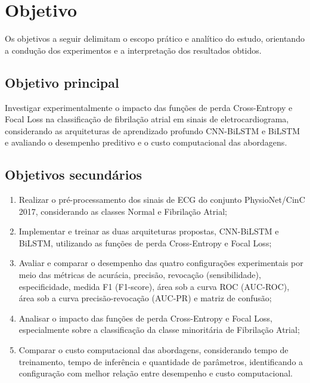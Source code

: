 \documentclass[
    12pt,                %
    openright,           %
    oneside,             %
    a4paper,             %
    english,             %
    brazil               %
]{abntex2}
\begin{document}
\section{Objetivo}
\label{sec:objetivo}

Os objetivos a seguir delimitam o escopo prático e analítico do estudo, orientando a condução dos experimentos e a interpretação dos resultados obtidos.

\subsection{Objetivo principal}

Investigar experimentalmente o impacto das funções
de perda Cross-Entropy e Focal Loss na classificação
de fibrilação atrial em sinais de eletrocardiograma,
considerando as arquiteturas de aprendizado profundo
CNN-BiLSTM e BiLSTM e avaliando o desempenho
preditivo e o custo computacional das abordagens.


\subsection{Objetivos secundários}

\begin{enumerate}
    \item Realizar o pré-processamento dos sinais de ECG do conjunto PhysioNet/CinC 2017, considerando as classes Normal e Fibrilação Atrial;
    \item Implementar e treinar as duas arquiteturas propostas, CNN-BiLSTM e BiLSTM, utilizando as funções de perda Cross-Entropy e Focal Loss;
    \item Avaliar e comparar o desempenho das quatro configurações experimentais por meio das métricas de acurácia, precisão, revocação (sensibilidade), especificidade, medida F1 (F1-score), área sob a curva ROC (AUC-ROC), área sob a curva precisão-revocação (AUC-PR) e matriz de confusão;
    \item Analisar o impacto das funções de perda Cross-Entropy e Focal Loss, especialmente sobre a classificação da classe minoritária de Fibrilação Atrial;
    \item Comparar o custo computacional das abordagens, considerando tempo de treinamento, tempo de inferência e quantidade de parâmetros, identificando a configuração com melhor relação entre desempenho e custo computacional.
\end{enumerate}


\end{document}
